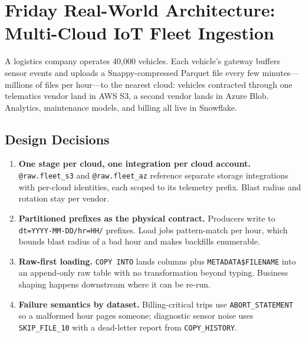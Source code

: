 \section{Friday Real-World Architecture: Multi-Cloud IoT Fleet Ingestion}
A logistics company operates 40,000 vehicles. Each vehicle's gateway buffers sensor events and uploads a Snappy-compressed Parquet file every few minutes---millions of files per hour---to the nearest cloud: vehicles contracted through one telematics vendor land in AWS S3, a second vendor lands in Azure Blob. Analytics, maintenance models, and billing all live in Snowflake.

\subsection{Design Decisions}
\begin{enumerate}
    \item \textbf{One stage per cloud, one integration per cloud account.} \texttt{@raw.fleet\_s3} and \texttt{@raw.fleet\_az} reference separate storage integrations with per-cloud identities, each scoped to its telemetry prefix. Blast radius and rotation stay per vendor.
    \item \textbf{Partitioned prefixes as the physical contract.} Producers write to \texttt{dt=YYYY-MM-DD/hr=HH/} prefixes. Load jobs pattern-match per hour, which bounds blast radius of a bad hour and makes backfills enumerable.
    \item \textbf{Raw-first loading.} \texttt{COPY INTO} lands columns plus \texttt{METADATA\$FILENAME} into an append-only raw table with no transformation beyond typing. Business shaping happens downstream where it can be re-run.
    \item \textbf{Failure semantics by dataset.} Billing-critical trips use \texttt{ABORT\_STATEMENT} so a malformed hour pages someone; diagnostic sensor noise uses \texttt{SKIP\_FILE\_10} with a dead-letter report from \texttt{COPY\_HISTORY}.
\end{enumerate}

